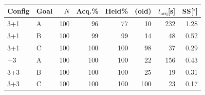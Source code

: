 \begin{tabular}{llrrrrrr}
\toprule
Config & Goal & $N$ & Acq.\% & Held\% & (old) & $t_\mathrm{acq}$[s] & SS[$^\circ$] \\
\midrule
3+1 & A & 100 & 96 & 77 & 10 & 232 & 1.28 \\
3+1 & B & 100 & 99 & 99 & 14 & 48 & 0.52 \\
3+1 & C & 100 & 100 & 100 & 98 & 37 & 0.29 \\
\addlinespace
3+3 & A & 100 & 100 & 100 & 22 & 156 & 0.43 \\
3+3 & B & 100 & 100 & 100 & 25 & 19 & 0.31 \\
3+3 & C & 100 & 100 & 100 & 100 & 23 & 0.17 \\
\bottomrule
\end{tabular}
